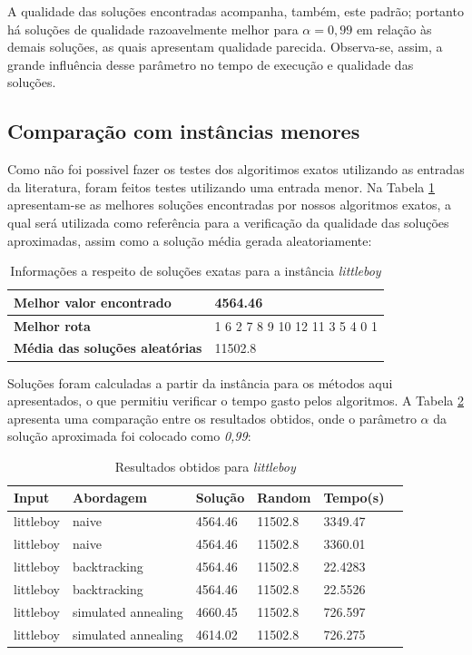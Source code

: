 \documentclass[a4paper, 12pt]{article}
\begin{document}
A qualidade das soluções encontradas acompanha, também, este padrão; portanto há soluções de qualidade razoavelmente melhor para $\alpha = 0,99$ em relação às demais soluções, as quais apresentam qualidade parecida. Observa-se, assim, a grande influência desse parâmetro no tempo de execução e qualidade das soluções.

\clearpage
\newpage
\subsection{Comparação com instâncias menores}

Como não foi possivel fazer os testes dos algoritimos exatos utilizando as entradas da literatura, foram feitos testes utilizando uma entrada menor. Na Tabela \ref{tab:bestLittle} apresentam-se as melhores soluções encontradas por nossos algoritmos exatos, a qual será utilizada como referência para a verificação da qualidade das soluções aproximadas, assim como a solução média gerada aleatoriamente:


\begin{table}[H]

\centering
\begin{tabular}{| l |  l |}
 \hline
 \textbf{Melhor valor encontrado} & 4564.46 \\
 \hline
\textbf{Melhor rota} & 1 6 2 7 8 9 10 12 11 3 5 4 0 1\\
 \hline
\textbf{Média das soluções aleatórias} & 11502.8\\
 \hline
\end{tabular}
\caption{\label{tab:bestLittle}Informações a respeito de soluções exatas para a instância \textit{littleboy}}
\end{table}

Soluções foram calculadas a partir da instância para os métodos aqui apresentados, o que permitiu verificar o tempo gasto pelos algoritmos. A Tabela \ref{tab:tempos} apresenta uma comparação entre os resultados obtidos, onde o parâmetro $\alpha$ da solução aproximada foi colocado como \textit{0,99}:

\begin{table}[H]

\centering
\begin{tabular}{| l | l | l | l | l | l |}
\hline
\textbf{Input} & \textbf{Abordagem }& \textbf{Solução} & \textbf{Random} & \textbf{Tempo(s)} \\\hline
littleboy & naive & 4564.46    & 11502.8 & 3349.47  \\\hline
littleboy & naive & 4564.46    & 11502.8 & 3360.01   \\\hline
littleboy & backtracking & 4564.46   & 11502.8  & 22.4283   \\\hline
littleboy & backtracking & 4564.46 & 11502.8     & 22.5526   \\\hline
littleboy & simulated annealing & 4660.45 & 11502.8     & 726.597    \\\hline
littleboy & simulated annealing & 4614.02 & 11502.8   & 726.275    \\\hline
\end{tabular}
\caption{\label{tab:tempos} Resultados obtidos para \textit{littleboy}}
\end{table}
\end{document}
